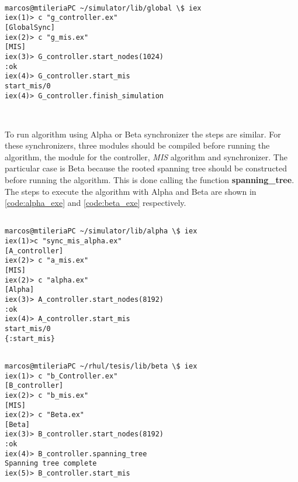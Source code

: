 \begin{lstlisting}[style=terminal]

marcos@mtileriaPC ~/simulator/lib/global \$ iex
iex(1)> c "g_controller.ex"
[GlobalSync]
iex(2)> c "g_mis.ex"     
[MIS]
iex(3)> G_controller.start_nodes(1024)
:ok
iex(4)> G_controller.start_mis        
start_mis/0    
iex(4)> G_controller.finish_simulation



\end{lstlisting}





To run algorithm using Alpha or Beta synchronizer the steps are similar. For these synchronizers, three modules should be compiled before running the algorithm, the module for the controller, \textit{MIS} algorithm and synchronizer. The particular case is Beta because the rooted spanning tree should be constructed before running the algorithm. This is done calling the function \textbf{spanning\_tree}. The steps to execute the algorithm with Alpha and Beta are shown in \ref{code:alpha_exe} and \ref{code:beta_exe} respectively.



\begin{lstlisting}[style=terminal,caption= Example of compiling and executing the algorithm with Alpha, label = code:alpha_exe]

marcos@mtileriaPC ~/simulator/lib/alpha \$ iex
iex(1)>c "sync_mis_alpha.ex"
[A_controller]
iex(2)> c "a_mis.ex"     
[MIS]
iex(2)> c "alpha.ex"     
[Alpha]
iex(3)> A_controller.start_nodes(8192)
:ok
iex(4)> A_controller.start_mis        
start_mis/0    
{:start_mis}
\end{lstlisting}

\begin{lstlisting}[style=terminal,caption= Example of compiling and executing the algorithm with Beta, label = code:beta_exe]

marcos@mtileriaPC ~/rhul/tesis/lib/beta \$ iex
iex(1)> c "b_Controller.ex"
[B_controller]
iex(2)> c "b_mis.ex"     
[MIS]
iex(2)> c "Beta.ex"     
[Beta]
iex(3)> B_controller.start_nodes(8192)
:ok
iex(4)> B_controller.spanning_tree       
Spanning tree complete   
iex(5)> B_controller.start_mis 

\end{lstlisting}

